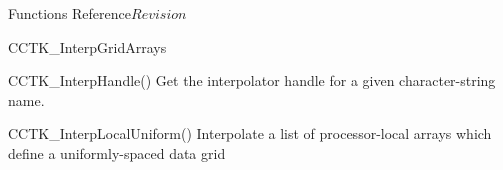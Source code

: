 \begin{cactuspart}{ Functions Reference}{}{$Revision$}
\begin{FunctionDescription}{CCTK\_InterpGridArrays}
\begin{SeeAlsoSection}
\begin{SeeAlso}{CCTK\_InterpHandle()}
Get the interpolator handle for a given character-string name.
\end{SeeAlso}
\begin{SeeAlso}{CCTK\_InterpLocalUniform()}
Interpolate a list of processor-local arrays
which define a uniformly-spaced data grid
\end{SeeAlso}
\end{SeeAlsoSection}


\end{FunctionDescription}
\end{cactuspart}
